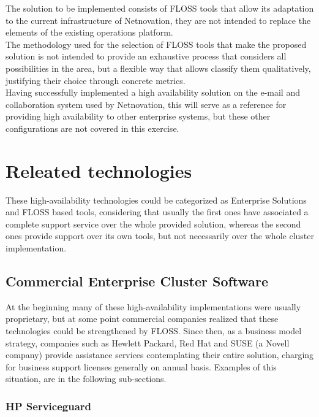 \documentclass[a4paper, 12pt]{book}
\begin{document}
The solution to be implemented consists of FLOSS tools that allow its adaptation to the current infrastructure of Netnovation, they are not intended to replace the elements of the existing operations  platform.\\

\noindent The methodology used for the selection of FLOSS tools that make the proposed solution is not intended to provide an exhaustive process that considers all possibilities in the area, but a flexible way that allows classify them qualitatively, justifying their choice through concrete metrics.\\

\noindent Having successfully implemented a high availability solution on the e-mail and collaboration system used by Netnovation, this will serve as a reference for providing high availability to other enterprise systems, but these other configurations are not covered in this exercise.\\


%
\chapter{Releated technologies}
\label{chap:related}
These high-availability technologies could be categorized as Enterprise Solutions and FLOSS based tools, considering that usually the first ones have associated a complete support service over the whole provided solution, whereas the second ones provide support over its own tools, but not necessarily over the whole cluster implementation.

\section{Commercial Enterprise Cluster Software}
\label{sec:enterprise}

At the beginning many of these high-availability implementations were usually proprietary, but at some point commercial companies realized that these technologies could be strengthened by FLOSS. Since then, as a business model strategy, companies such as Hewlett Packard, Red Hat and SUSE (a Novell company) provide assistance services contemplating their entire solution, charging for business support licenses generally on annual basis. Examples of this situation, are in the following sub-sections.

\subsection{HP Serviceguard}
\label{subsec:serviceguard}
\end{document}
